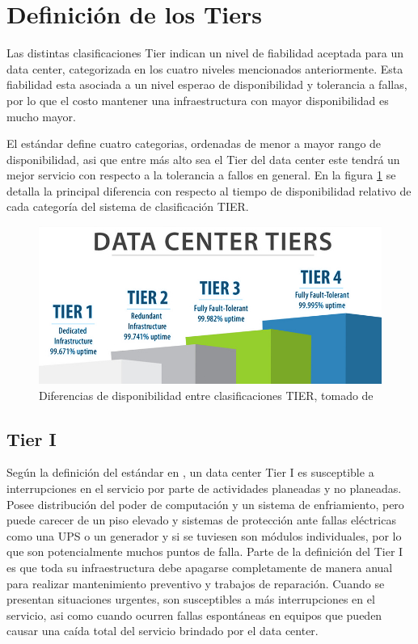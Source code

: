 \documentclass[journal]{IEEEtran}
\begin{document}
\section{Definición de los Tiers}
Las distintas clasificaciones Tier indican un nivel de fiabilidad aceptada para un data center, categorizada en los cuatro
niveles mencionados anteriormente. Esta fiabilidad esta asociada a un nivel esperao de disponibilidad y tolerancia a fallas, por lo que el costo
mantener una infraestructura con mayor disponibilidad es mucho mayor.

El estándar define cuatro categorias, ordenadas de menor a mayor rango de disponibilidad, asi que entre más alto sea el Tier del data center
este tendrá un mejor servicio con respecto a la tolerancia a fallos en general. 
En la figura \ref{volico} se detalla la principal diferencia con respecto al tiempo de disponibilidad relativo de cada categoría del sistema de clasificación TIER.
\begin{figure}
  \centering
  \includegraphics[scale=0.3]{Data-Center-Tiers.jpg}
  \caption{Diferencias de disponibilidad entre clasificaciones TIER, tomado de \cite{volico_2018}}
  \label{volico}
\end{figure}
\subsection{Tier I}
Según la definición del estándar en \cite{pitt_turner}, un data center Tier I es susceptible a interrupciones en el servicio por parte de actividades  planeadas y no planeadas.
Posee distribución del poder de computación y un sistema de enfriamiento, pero puede carecer de un piso elevado y sistemas de protección ante fallas 
eléctricas como una UPS o un generador y si se tuviesen son módulos individuales, por lo que son potencialmente muchos puntos de falla.
Parte de la definición del Tier I es que toda su infraestructura debe apagarse completamente de manera anual para realizar mantenimiento preventivo y trabajos de reparación.
Cuando se presentan situaciones urgentes, son susceptibles a más interrupciones en el servicio, asi  como cuando ocurren fallas espontáneas en equipos que pueden causar una caída total del servicio brindado por el data center.
\end{document}
